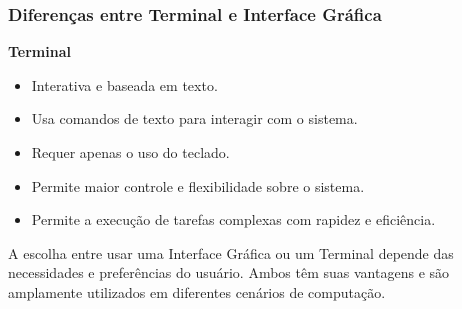 \documentclass{beamer}
\begin{document}
\begin{frame}\justifying
	\frametitle{Diferenças entre Terminal e Interface Gráfica}

	\textbf{Terminal}
	\begin{itemize}
		\item Interativa e baseada em texto.
		\item Usa comandos de texto para interagir com o sistema.
		\item Requer apenas o uso do teclado.
		\item Permite maior controle e flexibilidade sobre o sistema.
		\item Permite a execução de tarefas complexas com rapidez e eficiência.
	\end{itemize}

	A escolha entre usar uma Interface Gráfica ou um Terminal depende das necessidades e preferências do usuário. Ambos têm suas vantagens e são amplamente utilizados em diferentes cenários de computação.
\end{frame}
\end{document}
